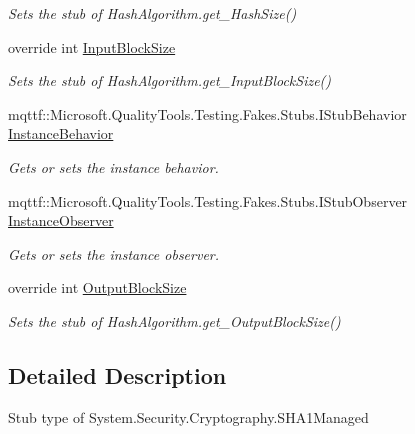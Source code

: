 \begin{DoxyCompactItemize}
\begin{DoxyCompactList}\small\item\em Sets the stub of Hash\-Algorithm.\-get\-\_\-\-Hash\-Size()\end{DoxyCompactList}\item 
override int \hyperlink{class_system_1_1_security_1_1_cryptography_1_1_fakes_1_1_stub_s_h_a1_managed_abdfd2f3bcfb8b06db42a60434306da68}{Input\-Block\-Size}
\begin{DoxyCompactList}\small\item\em Sets the stub of Hash\-Algorithm.\-get\-\_\-\-Input\-Block\-Size()\end{DoxyCompactList}\item 
mqttf\-::\-Microsoft.\-Quality\-Tools.\-Testing.\-Fakes.\-Stubs.\-I\-Stub\-Behavior \hyperlink{class_system_1_1_security_1_1_cryptography_1_1_fakes_1_1_stub_s_h_a1_managed_a15640e274ddd1ecbf7900218c99e34de}{Instance\-Behavior}
\begin{DoxyCompactList}\small\item\em Gets or sets the instance behavior.\end{DoxyCompactList}\item 
mqttf\-::\-Microsoft.\-Quality\-Tools.\-Testing.\-Fakes.\-Stubs.\-I\-Stub\-Observer \hyperlink{class_system_1_1_security_1_1_cryptography_1_1_fakes_1_1_stub_s_h_a1_managed_a57cf06f33fe05c8ea0660946d08a4fed}{Instance\-Observer}
\begin{DoxyCompactList}\small\item\em Gets or sets the instance observer.\end{DoxyCompactList}\item 
override int \hyperlink{class_system_1_1_security_1_1_cryptography_1_1_fakes_1_1_stub_s_h_a1_managed_a4f5246940a52ccea6d669a21d491b0e0}{Output\-Block\-Size}
\begin{DoxyCompactList}\small\item\em Sets the stub of Hash\-Algorithm.\-get\-\_\-\-Output\-Block\-Size()\end{DoxyCompactList}\end{DoxyCompactItemize}


\subsection{Detailed Description}
Stub type of System.\-Security.\-Cryptography.\-S\-H\-A1\-Managed



